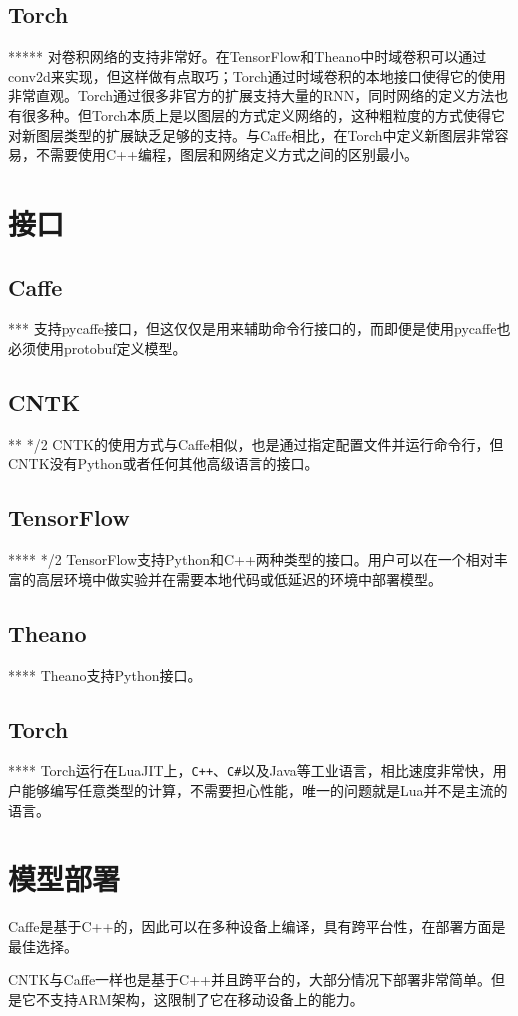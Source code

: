\subsection{Torch}
*****
对卷积网络的支持非常好。在TensorFlow和Theano中时域卷积可以通过conv2d来实现，但这样做有点取巧；Torch通过时域卷积的本地接口使得它的使用非常直观。Torch通过很多非官方的扩展支持大量的RNN，同时网络的定义方法也有很多种。但Torch本质上是以图层的方式定义网络的，这种粗粒度的方式使得它对新图层类型的扩展缺乏足够的支持。与Caffe相比，在Torch中定义新图层非常容易，不需要使用C++编程，图层和网络定义方式之间的区别最小。

\section{接口}
\subsection{Caffe}*** 支持pycaffe接口，但这仅仅是用来辅助命令行接口的，而即便是使用pycaffe也必须使用protobuf定义模型。
\subsection{CNTK}** */2
CNTK的使用方式与Caffe相似，也是通过指定配置文件并运行命令行，但CNTK没有Python或者任何其他高级语言的接口。
\subsection{TensorFlow}**** */2
TensorFlow支持Python和C++两种类型的接口。用户可以在一个相对丰富的高层环境中做实验并在需要本地代码或低延迟的环境中部署模型。
\subsection{Theano}****
Theano支持Python接口。
\subsection{Torch}****
Torch运行在LuaJIT上，\verb|C++|、\verb|C#|以及Java等工业语言，相比速度非常快，用户能够编写任意类型的计算，不需要担心性能，唯一的问题就是Lua并不是主流的语言。


\section{模型部署}
Caffe是基于C++的，因此可以在多种设备上编译，具有跨平台性，在部署方面是最佳选择。

CNTK与Caffe一样也是基于C++并且跨平台的，大部分情况下部署非常简单。但是它不支持ARM架构，这限制了它在移动设备上的能力。

